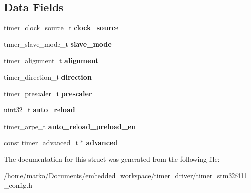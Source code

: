 \subsection*{Data Fields}
\begin{DoxyCompactItemize}
\item 
\mbox{\label{structtimer__config__t_afcad5c326fbc98732a2849a5225d8a10}} 
timer\+\_\+clock\+\_\+source\+\_\+t {\bfseries clock\+\_\+source}
\item 
\mbox{\label{structtimer__config__t_ad1aebaa930fb024d94829b73b1cef3a1}} 
timer\+\_\+slave\+\_\+mode\+\_\+t {\bfseries slave\+\_\+mode}
\item 
\mbox{\label{structtimer__config__t_ae59142bc6d98c07daf92bb4a0a863d5d}} 
timer\+\_\+alignment\+\_\+t {\bfseries alignment}
\item 
\mbox{\label{structtimer__config__t_a2302b90b0b06bc1915986e83fbec6eb0}} 
timer\+\_\+direction\+\_\+t {\bfseries direction}
\item 
\mbox{\label{structtimer__config__t_aec4b74e5d98386ca6cef3847203f8e32}} 
timer\+\_\+prescaler\+\_\+t {\bfseries prescaler}
\item 
\mbox{\label{structtimer__config__t_a6103ecdcf646d403714e19d5642243b3}} 
uint32\+\_\+t {\bfseries auto\+\_\+reload}
\item 
\mbox{\label{structtimer__config__t_a0464cd79f525a0c6d78838e4bc7e50e9}} 
timer\+\_\+arpe\+\_\+t {\bfseries auto\+\_\+reload\+\_\+preload\+\_\+en}
\item 
\mbox{\label{structtimer__config__t_afca478eacfee9c81af1cacb1c3e45195}} 
const \hyperlink{structtimer__advanced__t}{timer\+\_\+advanced\+\_\+t} $\ast$ {\bfseries advanced}
\end{DoxyCompactItemize}


The documentation for this struct was generated from the following file\+:\begin{DoxyCompactItemize}
\item 
/home/marko/\+Documents/embedded\+\_\+workspace/timer\+\_\+driver/timer\+\_\+stm32f411\+\_\+config.\+h\end{DoxyCompactItemize}

